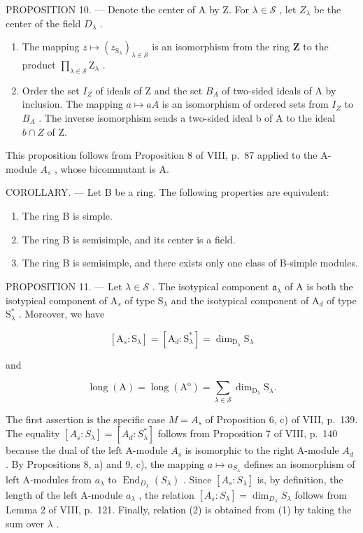 PROPOSITION 10. --- Denote the center of A by Z. For \(\lambda \in \mathcal{S}\) , let \(Z_{\lambda}\) be the center of the field \(D_{\lambda}\) .

\begin{enumerate}
\def\labelenumi{\alph{enumi})}
\item
  The mapping \(z \mapsto (z_{\mathrm{S}_{\lambda}})_{\lambda \in \mathcal{S}}\) is an isomorphism from the ring \(\mathbf{Z}\) to the product \(\prod_{\lambda \in \mathcal{S}}\mathrm{Z}_{\lambda}\) .
\item
  Order the set \(I_{Z}\) of ideals of Z and the set \(B_{A}\) of two-sided ideals of A by inclusion. The mapping \(a \mapsto aA\) is an isomorphism of ordered sets from \(I_{Z}\) to \(B_{A}\) . The inverse isomorphism sends a two-sided ideal b of A to the ideal \(b \cap Z\) of Z.
\end{enumerate}

This proposition follows from Proposition 8 of VIII, p.~87 applied to the A-module \(A_{s}\) , whose bicommutant is A.

COROLLARY. --- Let B be a ring. The following properties are equivalent:

\begin{enumerate}
\def\labelenumi{(\roman{enumi})}
\item
  The ring B is simple.
\item
  The ring B is semisimple, and its center is a field.
\item
  The ring B is semisimple, and there exists only one class of B-simple modules.
\end{enumerate}

PROPOSITION 11. --- Let \(\lambda \in \mathcal{S}\) . The isotypical component \(\mathfrak{a}_{\lambda}\) of A is both the isotypical component of \(\mathrm{A}_s\) of type \(\mathrm{S}_{\lambda}\) and the isotypical component of \(\mathrm{A}_d\) of type \(\mathrm{S}_{\lambda}^{*}\) . Moreover, we have

\[
[ \mathrm{A} _ {s}: \mathrm{S} _ {\lambda} ] = [ \mathrm{A} _ {d}: \mathrm{S} _ {\lambda} ^ {*} ] = \dim_ {\mathrm{D} _ {\lambda}} \mathrm{S} _ {\lambda}\tag{1}
\]

and

\[
\operatorname{long} (\mathrm{A}) = \operatorname{long} \left(\mathrm{A} ^ {\mathrm{o}}\right) = \sum_ {\lambda \in \mathscr {S}} \dim_ {\mathrm{D} _ {\lambda}} \mathrm{S} _ {\lambda}.\tag{2}
\]

The first assertion is the specific case \(M = A_{s}\) of Proposition 6, c) of VIII, p.~139. The equality \([A_{s} : S_{\lambda}] = [A_{d} : S_{\lambda}^{*}]\) follows from Proposition 7 of VIII, p.~140 because the dual of the left A-module \(A_{s}\) is isomorphic to the right A-module \(A_{d}\) . By Propositions 8, a) and 9, c), the mapping \(a \mapsto a_{S_{\lambda}}\) defines an isomorphism of left A-modules from \(a_{\lambda}\) to \(\operatorname{End}_{D_{\lambda}}(S_{\lambda})\) . Since \([A_{s} : S_{\lambda}]\) is, by definition, the length of the left A-module \(a_{\lambda}\) , the relation \([A_{s} : S_{\lambda}] = \dim_{D_{\lambda}} S_{\lambda}\) follows from Lemma 2 of VIII, p.~121. Finally, relation (2) is obtained from (1) by taking the sum over \(\lambda\) .

